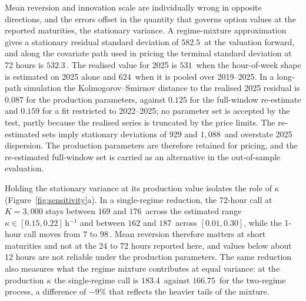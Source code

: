 Mean reversion and innovation scale are individually wrong in opposite
directions, and the errors offset in the quantity that governs option values
at the reported maturities, the stationary variance. A regime-mixture
approximation gives a stationary residual standard deviation of
$582.5$\,\TRY{} at the valuation forward, and along the covariate path used in
pricing the terminal standard deviation at 72 hours is $532.3$\,\TRY. The
realised value for 2025 is $531$\,\TRY{} when the hour-of-week shape is
estimated on 2025 alone and $624$\,\TRY{} when it is pooled over 2019--2025.
In a long-path simulation the Kolmogorov--Smirnov distance to the realised 2025
residual is $0.087$ for the production parameters, against $0.125$ for the
full-window re-estimate and $0.159$ for a fit restricted to 2022--2025; no
parameter set is accepted by the test, partly because the realised series is
truncated by the price limits. The re-estimated sets imply stationary
deviations of $929$ and $1{,}088$\,\TRY{} and overstate 2025 dispersion.
The production parameters are therefore retained for pricing, and the
re-estimated full-window set is carried as an alternative in the out-of-sample
evaluation.

Holding the stationary variance at its production value isolates the role of
$\kappa$ (Figure~\ref{fig:sensitivity}a). In a single-regime reduction, the
72-hour call at $K=3{,}000$ stays between $169$ and $176$\,\TRY{} across the
estimated range $\kappa\in[0.15,0.22]$\,h$^{-1}$ and between $162$ and
$187$\,\TRY{} across $[0.01,0.30]$, while the 1-hour call moves from $7$ to
$98$\,\TRY. Mean reversion therefore matters at short maturities and not at the
24 to 72 hours reported here, and values below about 12 hours are not reliable
under the production parameters. The same reduction also measures what the
regime mixture contributes at equal variance: at the production $\kappa$ the
single-regime call is $183.4$\,\TRY{} against $166.75$\,\TRY{} for the
two-regime process, a difference of $-9\%$ that reflects the heavier tails of
the mixture.
